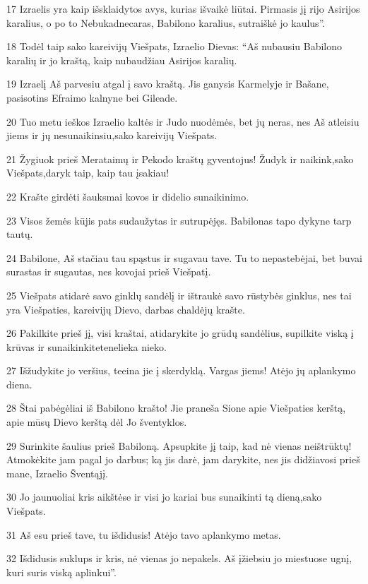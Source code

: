 \par 17 Izraelis yra kaip išsklaidytos avys, kurias išvaikė liūtai. Pirmasis jį rijo Asirijos karalius, o po to Nebukadnecaras, Babilono karalius, sutraiškė jo kaulus”. 
\par 18 Todėl taip sako kareivijų Viešpats, Izraelio Dievas: “Aš nubausiu Babilono karalių ir jo kraštą, kaip nubaudžiau Asirijos karalių. 
\par 19 Izraelį Aš parvesiu atgal į savo kraštą. Jis ganysis Karmelyje ir Bašane, pasisotins Efraimo kalnyne bei Gileade. 
\par 20 Tuo metu ieškos Izraelio kaltės ir Judo nuodėmės, bet jų neras, nes Aš atleisiu jiems ir jų nesunaikinsiu,­sako kareivijų Viešpats.­ 
\par 21 Žygiuok prieš Merataimų ir Pekodo kraštų gyventojus! Žudyk ir naikink,­sako Viešpats,­daryk taip, kaip tau įsakiau! 
\par 22 Krašte girdėti šauksmai kovos ir didelio sunaikinimo. 
\par 23 Visos žemės kūjis pats sudaužytas ir sutrupėjęs. Babilonas tapo dykyne tarp tautų. 
\par 24 Babilone, Aš stačiau tau spąstus ir sugavau tave. Tu to nepastebėjai, bet buvai surastas ir sugautas, nes kovojai prieš Viešpatį. 
\par 25 Viešpats atidarė savo ginklų sandėlį ir ištraukė savo rūstybės ginklus, nes tai yra Viešpaties, kareivijų Dievo, darbas chaldėjų krašte. 
\par 26 Pakilkite prieš jį, visi kraštai, atidarykite jo grūdų sandėlius, supilkite viską į krūvas ir sunaikinkite­tenelieka nieko. 
\par 27 Išžudykite jo veršius, teeina jie į skerdyklą. Vargas jiems! Atėjo jų aplankymo diena. 
\par 28 Štai pabėgėliai iš Babilono krašto! Jie praneša Sione apie Viešpaties kerštą, apie mūsų Dievo kerštą dėl Jo šventyklos. 
\par 29 Surinkite šaulius prieš Babiloną. Apsupkite jį taip, kad nė vienas neištrūktų! Atmokėkite jam pagal jo darbus; ką jis darė, jam darykite, nes jis didžiavosi prieš mane, Izraelio Šventąjį. 
\par 30 Jo jaunuoliai kris aikštėse ir visi jo kariai bus sunaikinti tą dieną,­sako Viešpats.­ 
\par 31 Aš esu prieš tave, tu išdidusis! Atėjo tavo aplankymo metas. 
\par 32 Išdidusis suklups ir kris, nė vienas jo nepakels. Aš įžiebsiu jo miestuose ugnį, kuri suris viską aplinkui”. 
